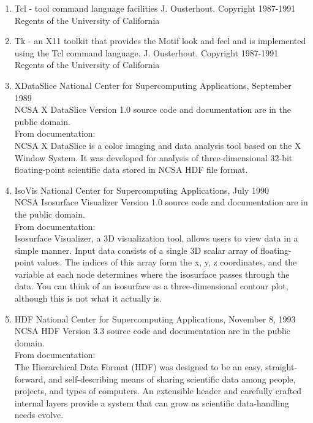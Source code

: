 \begin{enumerate}
\item{Tcl}\label{soft-Tcl}
  - tool command language facilities\hfil\break
  J. Ousterhout. Copyright 1987-1991 Regents of the University of
  California

\item{Tk}\label{soft-Tk}
  - an X11 toolkit that provides the Motif look and feel and is
  implemented using the Tcl command language.\hfil\break
  J. Ousterhout. Copyright 1987-1991 Regents of the University of
  California

\item{XDataSlice}\label{soft-XDS}
  \hfil\break
  National Center for Supercomputing Applications, September 1989\\ %
  NCSA X DataSlice Version 1.0 source code and documentation are in
  the public domain.\\ %
  From documentation:\\ %
  NCSA X DataSlice is a color imaging and data analysis tool based on
  the X Window System. It was developed for analysis of
  three-dimensional 32-bit floating-point scientific data stored in
  NCSA HDF file format.

\item{IsoVis}\label{soft-isovis}
  \hfil\break
  National Center for Supercomputing Applications, July 1990\\ %
  NCSA Isosurface Visualizer Version 1.0 source code and documentation
  are in the public domain.\\ %
  From documentation:\\ %
  Isosurface Visualizer, a 3D visualization tool, allows users to view
  data in a simple manner. Input data consists of a single 3D scalar
  array of floating-point values. The indices of this array form the
  x, y, z coordinates, and the variable at each node determines where
  the isosurface passes through the data. You can think of an
  isosurface as a three-dimensional contour plot, although this is not
  what it actually is.

\item{HDF}\label{soft-HDF}
  \hfil\break
  National Center for Supercomputing Applications, November 8, 1993\\ %
  NCSA HDF Version 3.3 source code and documentation are in the public
  domain.\\ %
  From documentation:\\ %
  The Hierarchical Data Format (HDF) was designed to be an easy,
  straight-forward, and self-describing means of sharing scientific
  data among people, projects, and types of computers. An extensible
  header and carefully crafted internal layers provide a system that
  can grow as scientific data-handling needs evolve.


\end{enumerate}
